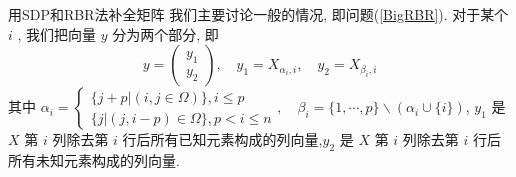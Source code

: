 \documentclass[slidestop,compress,mathserif,UTF8]{beamer}
\numberwithin{equation}{section}
\begin{document}
            \begin{frame}[t]{用SDP和RBR法补全矩阵}
                我们主要讨论一般的情况, 即问题(\ref{BigRBR}). 对于某个 $i$ , 我们把向量 $y$ 分为两个部分, 即
                \begin{equation}\label{BigRBRCondition1}
                    y = \begin{pmatrix}y_1 \\ y_2\end{pmatrix}, \quad
                    y_1 = X_{\alpha_i, i}, \quad
                    y_2 = X_{\beta_i, i}
                \end{equation}
                \small{其中
                $
                    \alpha_i=
                        \begin{cases}
                            \{j + p \vert (i, j \in \Omega)\}, i \leq p\\
                            \{j \vert (j, i - p) \in \Omega\}, p < i \leq n
                        \end{cases}
                        ,\quad
                    \beta_i = 
                        \{1, \cdots, p\} \backslash (\alpha_i \cup \{i\})
                $,
                $y_1$ 是 $X$ 第 $i$ 列除去第 $i$ 行后所有已知元素构成的列向量,$y_2$ 是 $X$ 第 $i$ 列除去第 $i$ 行后所有未知元素构成的列向量.}\normalsize
            \end{frame}
\end{document}
